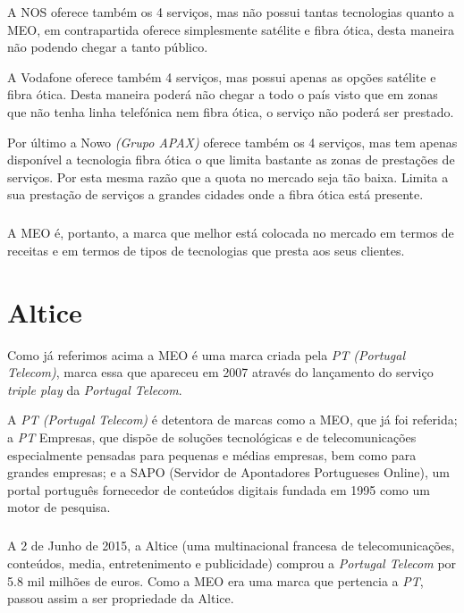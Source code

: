 \documentclass{report}
\begin{document}
	A NOS oferece também os 4 serviços, mas não possui tantas tecnologias quanto a MEO, em contrapartida oferece simplesmente satélite e fibra ótica, desta maneira não podendo chegar a tanto público.
	
	 A Vodafone oferece também 4 serviços, mas possui apenas as opções satélite e fibra ótica. Desta maneira poderá não chegar a todo o país visto que em zonas que não tenha linha telefónica nem fibra ótica, o serviço não poderá ser prestado.
	 
	Por último a Nowo \textit{(Grupo APAX)} oferece também os 4 serviços, mas tem apenas disponível a tecnologia fibra ótica o que limita bastante as zonas de prestações de serviços. Por esta mesma razão que a quota no mercado seja tão baixa. Limita a sua prestação de serviços a grandes cidades onde a fibra ótica está presente. 
	
\paragraph{}
	A MEO é, portanto, a marca que melhor está colocada no mercado em termos de receitas e em termos de tipos de tecnologias que presta aos seus clientes.
	

\chapter{Altice}
\label{chap.altice}

Como já referimos acima a MEO é uma marca criada pela \textit{PT (Portugal Telecom)}, marca essa que apareceu em 2007 através do lançamento do serviço \textit{triple play} da \textit{Portugal Telecom}.

	A \textit{PT (Portugal Telecom)} é detentora de marcas como a MEO, que já foi referida; a \textit{PT} Empresas, que dispõe de soluções tecnológicas e de telecomunicações especialmente pensadas para pequenas e médias empresas, bem como para grandes empresas; e a SAPO (Servidor de Apontadores Portugueses Online), um portal português fornecedor de conteúdos digitais fundada em 1995 como um motor de pesquisa. 

\paragraph{}
	A 2 de Junho de 2015, a Altice (uma multinacional francesa de telecomunicações, conteúdos, media, entretenimento e publicidade) comprou a \textit{Portugal Telecom} por 5.8 mil milhões de euros. Como a MEO era uma marca que pertencia a \textit{PT}, passou assim a ser propriedade da Altice. 
	
\end{document}
